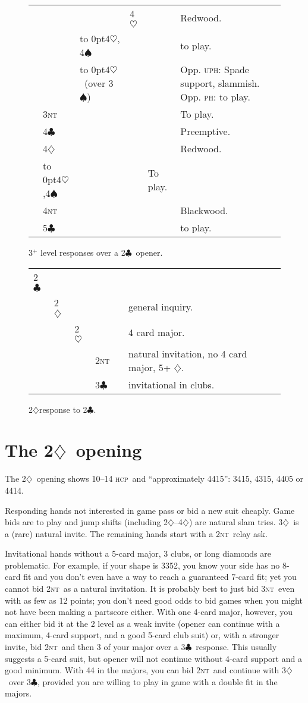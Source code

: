 \documentclass{report}
\newcommand{\hcp}{\textsc{hcp}}
\newcommand{\ph}{\textsc{ph}}
\newcommand{\uph}{\textsc{uph}}
\renewcommand{\c}{\ensuremath{\clubsuit}}
\renewcommand{\d}{\ensuremath{\diamondsuit}}
\newcommand{\h}{\ensuremath{\heartsuit}}
\newcommand{\s}{\ensuremath{\spadesuit}}
\newcommand{\nt}{\textsc{nt}}
\newcommand{\+}{\ensuremath{^+}}
\begin{document}
\begin{figure}[ht]
\begin{tabular}{llllll}
&    &    & 4\h && Redwood.\\
&    & \hbox to 0pt{4\h, 4\s\hss} &&& to play.\\
&    & \hbox to 0pt{4\h\ (over 3\s)\hss} &&& Opp. \uph: Spade support, slammish.  Opp. \ph: to play.\\
&3\nt &&&& To play.\\
&4\c &&&& Preemptive.\\
&4\d &&&& Redwood.\\
&\hbox to 0pt{4\h,4\s\hss} &&& To play.\\
&4\nt &&&& Blackwood.\\
&5\c &&&& to play.\\
\end{tabular}
\caption{3\+ level responses over a 2\c\ opener.}
\end{figure}

\begin{figure}[ht]
\begin{tabular}{llllll}
2\c \\
&2\d &&&& general inquiry. \\
&   & 2\h &&& 4 card major. \\
&   &   & 2\nt && natural invitation, no 4 card major, 5+ \d. \\
&   &   & 3\c && invitational in clubs. \\
\end{tabular}
\caption{2\d response to 2\c.}
\end{figure}
\newpage

\chapter{The 2\d\ opening}

The 2\d\ opening shows 10--14 \hcp\ and ``approximately 4415'': 3415,
4315, 4405 or 4414.

Responding hands not interested in game pass or bid a new suit
cheaply.  Game bids are to play and jump shifts (including 2\d--4\d)
are natural slam tries.  3\d\ is a (rare) natural invite.  The
remaining hands start with a 2\nt\ relay ask.

Invitational hands without a 5-card major, 3 clubs, or long diamonds
are problematic.  For example, if your shape is 3352, you know your
side has no 8-card fit and you don't even have a way to reach a
guaranteed 7-card fit; yet you cannot bid 2\nt\ as a natural
invitation.  It is probably best to just bid 3\nt\ even with as few as
12 points; you don't need good odds to bid games when you might not
have been making a partscore either.  With one 4-card major, however,
you can either bid it at the 2 level as a weak invite (opener can
continue with a maximum, 4-card support, and a good 5-card club suit)
or, with a stronger invite, bid 2\nt\ and then 3 of your major over a
3\c\ response.  This usually suggests a 5-card suit, but opener will
not continue without 4-card support and a good minimum.  With 44 in
the majors, you can bid 2\nt\ and continue with 3\d\ over 3\c,
provided you are willing to play in game with a double fit in the
majors.
\end{document}
